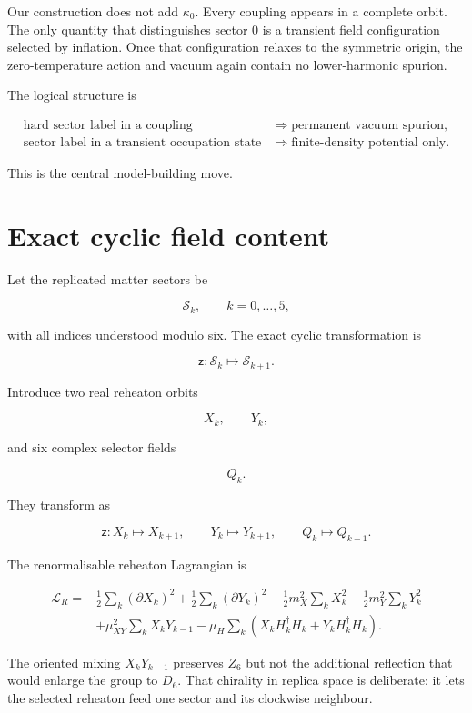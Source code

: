 \documentclass[
  10pt,
]{article}
\begin{document}
Our construction does not add \(\kappa_0\). Every coupling appears in a
complete orbit. The only quantity that distinguishes sector 0 is a
transient field configuration selected by inflation. Once that
configuration relaxes to the symmetric origin, the zero-temperature
action and vacuum again contain no lower-harmonic spurion.

The logical structure is

\[
\boxed{
\begin{aligned}
\text{hard sector label in a coupling}
&\Rightarrow
\text{permanent vacuum spurion},\\
\text{sector label in a transient occupation state}
&\Rightarrow
\text{finite-density potential only}.
\end{aligned}
}
\]

This is the central model-building move.

\section{Exact cyclic field content}\label{exact-cyclic-field-content}

Let the replicated matter sectors be

\[
\mathcal S_k,
\qquad
k=0,\ldots,5,
\]

with all indices understood modulo six. The exact cyclic transformation
is

\[
\mathsf z:
\mathcal S_k\mapsto\mathcal S_{k+1}.
\]

Introduce two real reheaton orbits

\[
X_k,
\qquad
Y_k,
\]

and six complex selector fields

\[
Q_k.
\]

They transform as

\[
\mathsf z:
X_k\mapsto X_{k+1},
\qquad
Y_k\mapsto Y_{k+1},
\qquad
Q_k\mapsto Q_{k+1}.
\]

The renormalisable reheaton Lagrangian is

\[
\begin{aligned}
\mathcal L_R
={}&
\frac12\sum_k(\partial X_k)^2
+
\frac12\sum_k(\partial Y_k)^2
-
\frac12m_X^2\sum_kX_k^2
-
\frac12m_Y^2\sum_kY_k^2
\\
&+
\mu_{XY}^2\sum_kX_kY_{k-1}
-
\mu_H\sum_k
\left(
X_kH_k^\dagger H_k
+
Y_kH_k^\dagger H_k
\right).
\end{aligned}
\]

The oriented mixing \(X_kY_{k-1}\) preserves \(Z_6\) but not the
additional reflection that would enlarge the group to \(D_6\). That
chirality in replica space is deliberate: it lets the selected reheaton
feed one sector and its clockwise neighbour.
\end{document}
